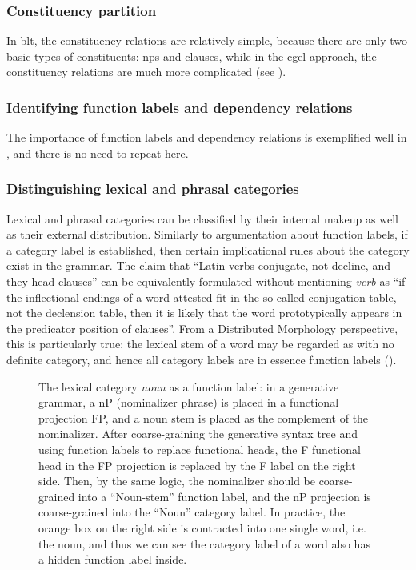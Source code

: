 \documentclass{article}
\newcommand*{\term}[1]{\emph{#1}}
\begin{document}
\subsubsection{Constituency partition}

In \ac{blt}, the constituency relations are relatively simple,
because there are only two basic types of constituents: 
\ac{np}s and clauses,
while in the \ac{cgel} approach,
the constituency relations are much more complicated
(see ). 

\subsubsection{Identifying function labels and dependency relations}

The importance of function labels and dependency relations 
is exemplified well in ,
and there is no need to repeat here.


\subsubsection{Distinguishing lexical and phrasal categories}

Lexical and phrasal categories can be classified by their internal makeup as well as 
their external distribution.
Similarly to argumentation about function labels,
if a category label is established,
then certain implicational rules about the category exist in the grammar.
The claim that 
``Latin verbs conjugate, not decline, and they head clauses''
can be equivalently formulated without mentioning \term{verb} as 
``if the inflectional endings of a word attested fit in the so-called conjugation table,
not the declension table,
then it is likely that the word prototypically appears in the predicator position of clauses''.
From a Distributed Morphology perspective,
this is particularly true:
the lexical stem of a word may be regarded as with no definite category,
and hence all category labels are in essence function labels ().

\begin{figure}
    \centering
    
    \caption{The lexical category \term{noun} as a function label:
    in a generative grammar, a nP (nominalizer phrase) is placed in a functional projection FP,
    and a noun stem is placed as the complement of the nominalizer.
    After coarse-graining the generative syntax tree 
    and using function labels to replace functional heads,
    the F functional head in the FP projection is replaced by the F label on the right side.
    Then, by the same logic, 
    the nominalizer should be coarse-grained into a ``Noun-stem'' function label,
    and the nP projection is coarse-grained into the ``Noun'' category label.
    In practice, the orange box on the right side
    is contracted into one single word, i.e. the noun,
    and thus we can see the category label of a word also has a hidden function label inside.}
    \label{fig:noun-function}
\end{figure}
\end{document}
